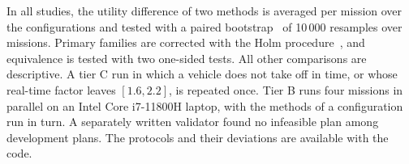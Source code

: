 In all studies, the utility difference of two methods is averaged per mission over the configurations and tested with a
paired bootstrap~\cite{efron1993bootstrap} of 10\,000 resamples over missions. Primary families are corrected with the
Holm procedure~\cite{holm1979simple}, and equivalence is tested with two one-sided tests. All other comparisons are
descriptive. A tier C run in which a vehicle does not take off in time, or whose real-time factor leaves $[1.6, 2.2]$,
is repeated once. Tier B runs four missions in parallel on an Intel Core i7-11800H laptop, with the methods of a
configuration run in turn. A separately written validator found no infeasible plan among 
development plans. The protocols and their deviations are available with the code.
